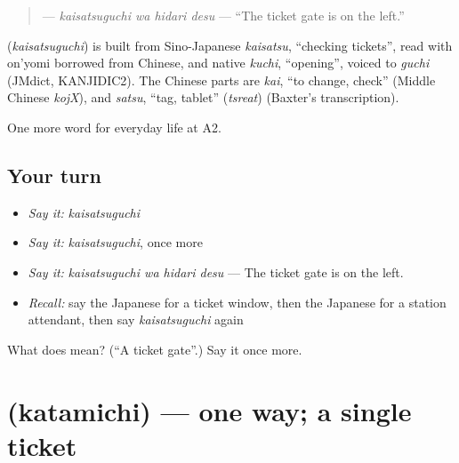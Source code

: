 \begin{quote}
\textbf{ } — \emph{kaisatsuguchi wa hidari desu} — \textquotedblleft{}The ticket gate is on the left.\textquotedblright{}
\end{quote}

\begin{cousinweb}
\textbf{} (\emph{kaisatsuguchi}) is built from Sino-Japanese \emph{kaisatsu}, \textquotedblleft{}checking tickets\textquotedblright{}, read with on'yomi borrowed from Chinese, and native \emph{kuchi}, \textquotedblleft{}opening\textquotedblright{}, voiced to \emph{guchi} (JMdict, KANJIDIC2). The Chinese parts are \emph{kai}, \textquotedblleft{}to change, check\textquotedblright{} (Middle Chinese \emph{kojX}), and \emph{satsu}, \textquotedblleft{}tag, tablet\textquotedblright{} (\emph{tsreat}) (Baxter's transcription).
\end{cousinweb}

\begin{grammarlens}[title={What you've built}]
One more word for everyday life at A2.
\end{grammarlens}

\subsection*{Your turn}
\begin{itemize}
\raggedright
  \item \emph{Say it:} \emph{kaisatsuguchi}
  \item \emph{Say it:} \emph{kaisatsuguchi}, once more
  \item \emph{Say it:} \emph{kaisatsuguchi wa hidari desu} — The ticket gate is on the left.
  \item \emph{Recall:} say the Japanese for a ticket window, then the Japanese for a station attendant, then say \emph{kaisatsuguchi} again
\end{itemize}

\begin{tcolorbox}[breakable,colback=teal!4,colframe=teal!35!black,title={Before you move on}]
What does  mean? (\textquotedblleft{}A ticket gate\textquotedblright{}.) Say it once more.
\end{tcolorbox}
\section[\texorpdfstring{\ja{かたみち} (katamichi)}{かたみち (katamichi)}]{ (katamichi) — one way; a single ticket}

